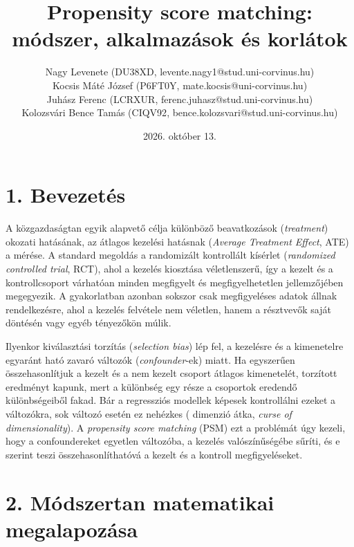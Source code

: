 \documentclass[11pt,a4paper]{article}
\title{\textbf{Propensity score matching:}\\\textbf{módszer, alkalmazások és korlátok}}
\author{%
  {Nagy Levenete} ({DU38XD}, {levente.nagy1@stud.uni-corvinus.hu})\\
  {Kocsis Máté József} ({P6FT0Y}, {mate.kocsis@uni-corvinus.hu})\\
  {Juhász Ferenc} ({LCRXUR}, {ferenc.juhasz@stud.uni-corvinus.hu})\\
  {Kolozsvári Bence Tamás} ({CIQV92}, {bence.kolozsvari@stud.uni-corvinus.hu})
  }
\date{2026. október 13.}
\begin{document}
\maketitle

\section*{1. Bevezetés}

A közgazdaságtan egyik alapvető célja különböző beavatkozások (\emph{treatment}) okozati hatásának,
az átlagos kezelési hatásnak (\emph{Average Treatment Effect}, ATE) a mérése. A standard megoldás
a randomizált kontrollált kísérlet (\emph{randomized controlled trial}, RCT), ahol a kezelés kiosztása
véletlenszerű, így a kezelt és a kontrollcsoport várhatóan minden megfigyelt és megfigyelhetetlen
jellemzőjében megegyezik. A gyakorlatban azonban sokszor csak megfigyeléses adatok állnak
rendelkezésre, ahol a kezelés felvétele nem véletlen, hanem a résztvevők saját döntésén vagy egyéb
tényezőkön múlik.

Ilyenkor kiválasztási torzítás (\emph{selection bias}) lép fel, a kezelésre és a kimenetelre egyaránt ható
zavaró változók (\emph{confounder}-ek) miatt. Ha egyszerűen összehasonlítjuk a kezelt és a nem kezelt
csoport átlagos kimenetelét, torzított eredményt kapunk, mert a különbség egy része a csoportok
eredendő különbségeiből fakad.
 Bár a regressziós modellek képesek kontrollálni ezeket a változókra, sok változó esetén ez nehézkes ( dimenzió átka,
\emph{curse of dimensionality}). A \emph{propensity score matching} (PSM) ezt a problémát úgy kezeli, hogy a confoundereket egyetlen változóba, a kezelés valószínűségébe sűríti, és e szerint teszi összehasonlíthatóvá a
kezelt és a kontroll megfigyeléseket.

\section*{2. Módszertan matematikai megalapozása}
\end{document}
